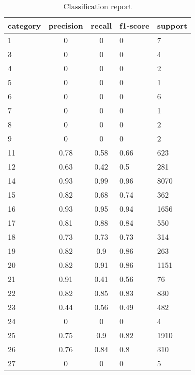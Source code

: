 \begin{longtable}[c]{|l|c|c|l|l|}
	\caption[Classification report]{Classification report}
	\label{tab:amortecimentos}\\
	\hline  category & precision & recall &  f1-score & support\\ \hline
	\endhead
	\hline
	\endlastfoot
	
	1        & 0         & 0      & 0        & 7       \\
	3        & 0         & 0      & 0        & 4       \\
	4        & 0         & 0      & 0        & 2       \\
	5        & 0         & 0      & 0        & 1       \\
	6        & 0         & 0      & 0        & 6       \\
	7        & 0         & 0      & 0        & 1       \\
	8        & 0         & 0      & 0        & 2       \\
	9        & 0         & 0      & 0        & 2       \\
	11       & 0.78      & 0.58   & 0.66     & 623     \\
	12       & 0.63      & 0.42   & 0.5      & 281     \\
	14       & 0.93      & 0.99   & 0.96     & 8070    \\
	15       & 0.82      & 0.68   & 0.74     & 362     \\
	16       & 0.93      & 0.95   & 0.94     & 1656    \\
	17       & 0.81      & 0.88   & 0.84     & 550     \\
	18       & 0.73      & 0.73   & 0.73     & 314     \\
	19       & 0.82      & 0.9    & 0.86     & 263     \\
	20       & 0.82      & 0.91   & 0.86     & 1151    \\
	21       & 0.91      & 0.41   & 0.56     & 76      \\
	22       & 0.82      & 0.85   & 0.83     & 830     \\
	23       & 0.44      & 0.56   & 0.49     & 482     \\
	24       & 0         & 0      & 0        & 4       \\
	25       & 0.75      & 0.9    & 0.82     & 1910    \\
	26       & 0.76      & 0.84   & 0.8      & 310     \\
	27       & 0         & 0      & 0        & 5       \\

\end{longtable}
